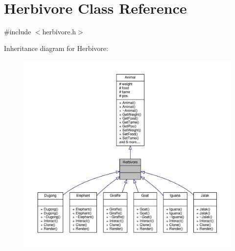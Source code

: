 \hypertarget{classHerbivore}{}\section{Herbivore Class Reference}
\label{classHerbivore}


{\ttfamily \#include $<$herbivore.\+h$>$}



Inheritance diagram for Herbivore\+:
\nopagebreak
\begin{figure}[H]
\begin{center}
\leavevmode
\includegraphics[width=350pt]{classHerbivore__inherit__graph}
\end{center}
\end{figure}



